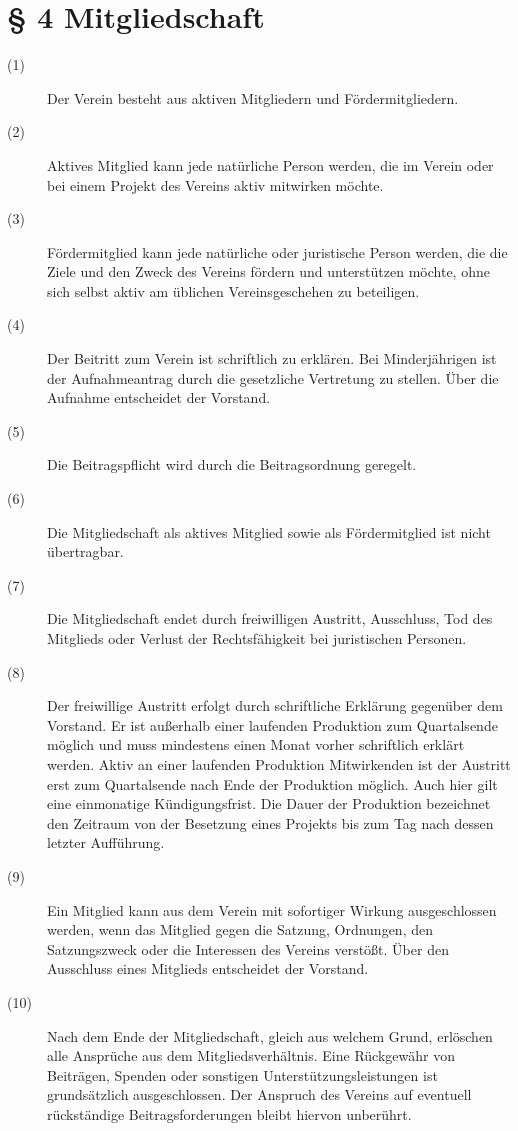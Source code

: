 \documentclass[a4paper,12pt]{scrartcl}
\begin{document}
\section*{\S{} 4 Mitgliedschaft}
\begin{description} 

\item[(1)] Der Verein besteht aus aktiven Mitgliedern und Fördermitgliedern.
\item[(2)] Aktives Mitglied kann jede natürliche Person werden, die im Verein oder bei einem Projekt des Vereins aktiv mitwirken möchte.
\item[(3)] Fördermitglied kann jede natürliche oder juristische Person werden, die die Ziele und den Zweck des Vereins fördern und unterstützen möchte, ohne sich selbst aktiv am üblichen Vereinsgeschehen zu beteiligen.
\item[(4)] Der Beitritt zum Verein ist schriftlich zu erklären. Bei Minderjährigen ist der Aufnahmeantrag durch die gesetzliche Vertretung zu stellen. Über die Aufnahme entscheidet der Vorstand.
\item[(5)] Die Beitragspflicht wird durch die Beitragsordnung geregelt.
\item[(6)] Die Mitgliedschaft als aktives Mitglied sowie als Fördermitglied ist nicht übertragbar. 
\item[(7)] Die Mitgliedschaft endet durch freiwilligen Austritt, Ausschluss, Tod des Mitglieds oder Verlust der Rechtsfähigkeit bei juristischen Personen. 
\item[(8)] Der freiwillige Austritt erfolgt durch schriftliche Erklärung gegenüber dem Vorstand. Er ist außerhalb einer laufenden Produktion zum Quartalsende möglich und muss mindestens einen Monat vorher schriftlich erklärt werden. Aktiv an einer laufenden Produktion Mitwirkenden ist der Austritt erst zum Quartalsende nach Ende der Produktion möglich. Auch hier gilt eine einmonatige Kündigungsfrist. Die Dauer der Produktion bezeichnet den Zeitraum von der Besetzung eines Projekts bis zum Tag nach dessen letzter Aufführung.
\item[(9)] Ein Mitglied kann aus dem Verein mit sofortiger Wirkung ausgeschlossen werden, wenn das Mitglied gegen die Satzung, Ordnungen, den Satzungszweck oder die Interessen des Vereins verstößt. Über den Ausschluss eines Mitglieds entscheidet der Vorstand.
\item[(10)] Nach dem Ende der Mitgliedschaft, gleich aus welchem Grund, erlöschen alle Ansprüche aus dem Mitgliedsverhältnis. Eine Rückgewähr von Beiträgen, Spenden oder sonstigen Unterstützungsleistungen ist grundsätzlich ausgeschlossen. Der Anspruch des Vereins auf eventuell rückständige Beitragsforderungen bleibt hiervon unberührt.

\end{description}
\end{document}

